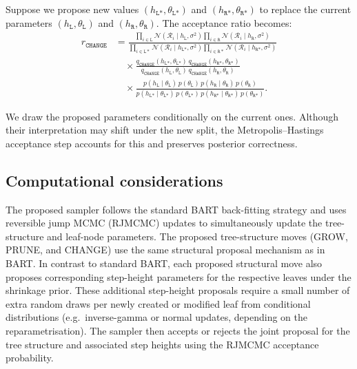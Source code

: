 Suppose we propose new values $(h_{\texttt{L}*}, \theta_{\texttt{L}*})$ and $(h_{\texttt{R}*}, \theta_{\texttt{R}*})$ to replace the current parameters $(h_\texttt{L}, \theta_\texttt{L})$ and $(h_\texttt{R}, \theta_\texttt{R})$. The acceptance ratio becomes:
\begin{equation}
\begin{split}
    r_\texttt{CHANGE} 
    &= \frac{\prod_{i \in \texttt{L}} \mathcal{N}(\mathcal{R}_i \mid h_\texttt{L}, \sigma^2) \prod_{i \in \texttt{R}} \mathcal{N}(\mathcal{R}_i \mid h_\texttt{R}, \sigma^2)}{\prod_{i \in \texttt{L}*} \mathcal{N}(\mathcal{R}_i \mid h_{\texttt{L}*}, \sigma^2) \prod_{i \in \texttt{R}*} \mathcal{N}(\mathcal{R}_i \mid h_{\texttt{R}*}, \sigma^2)} \\
    &\quad \times \frac{q_\texttt{CHANGE}(h_{\texttt{L}*}, \theta_{\texttt{L}*}) \, q_\texttt{CHANGE}(h_{\texttt{R}*}, \theta_{\texttt{R}*})}{q_\texttt{CHANGE}(h_\texttt{L}, \theta_\texttt{L}) \, q_\texttt{CHANGE}(h_\texttt{R}, \theta_\texttt{R})} \\
    &\quad \times \frac{p(h_\texttt{L} \mid \theta_\texttt{L}) \, p(\theta_\texttt{L}) \, p(h_\texttt{R} \mid \theta_\texttt{R}) \, p(\theta_\texttt{R})}{p(h_{\texttt{L}*} \mid \theta_{\texttt{L}*}) \, p(\theta_{\texttt{L}*}) \, p(h_{\texttt{R}*} \mid \theta_{\texttt{R}*}) \, p(\theta_{\texttt{R}*})}.
\end{split}
\end{equation}

We draw the proposed parameters conditionally on the current ones. 
Although their interpretation may shift under the new split, the Metropolis--Hastings acceptance step accounts for this and preserves posterior correctness.

\subsection{Computational considerations}
The proposed sampler follows the standard BART back-fitting strategy and uses reversible jump MCMC (RJMCMC) updates to simultaneously update the tree-structure and leaf-node parameters.
The proposed tree-structure moves (GROW, PRUNE, and CHANGE) use the same structural proposal mechanism as in BART.
In contrast to standard BART, each proposed structural move also proposes corresponding step-height parameters for the respective leaves under the shrinkage prior.
These additional step-height proposals require a small number of extra random draws per newly created or modified leaf from conditional distributions (e.g.\ inverse-gamma or normal updates, depending on the reparametrisation).
The sampler then accepts or rejects the joint proposal for the tree structure and associated step heights using the RJMCMC acceptance probability.


